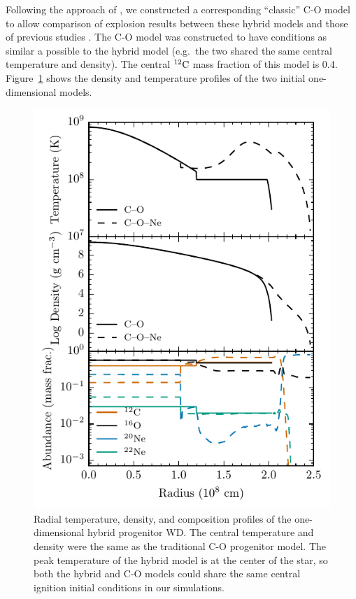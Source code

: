 \documentclass[preprint2]{aastex63}
\newcommand{\C}[1]{\ensuremath{{}^{#1}{\rm C}}}
\begin{document}
Following the approach of \citet{willcoxetal2016}, we constructed a
corresponding ``classic'' C-O model to allow comparison of explosion
results between these hybrid models and those of previous studies
\citep{Krueger2010On-Variations-o,Kruegeretal2012}. The C-O model was 
constructed to have conditions as similar a possible to the hybrid
model (e.g.\  the two shared the same central temperature and density).  
{\color{blue} 
The central \C{12} mass fraction of this model is 0.4.
}
Figure~\ref{fig:init_conds} shows the density and temperature
profiles of the two initial one-dimensional models.
\begin{figure}
\includegraphics[width=\columnwidth]{figures/temp_dens_abund_profile.pdf}
\caption{\label{fig:init_conds}
Radial temperature, density, and  composition profiles of the one-dimensional hybrid
progenitor WD. The central temperature and density were the same as
the traditional C-O progenitor model.
The peak temperature of the hybrid model is at the center of the star,
so both the hybrid and C-O models could share the same central ignition initial conditions in our simulations.
}
\end{figure}
\end{document}
